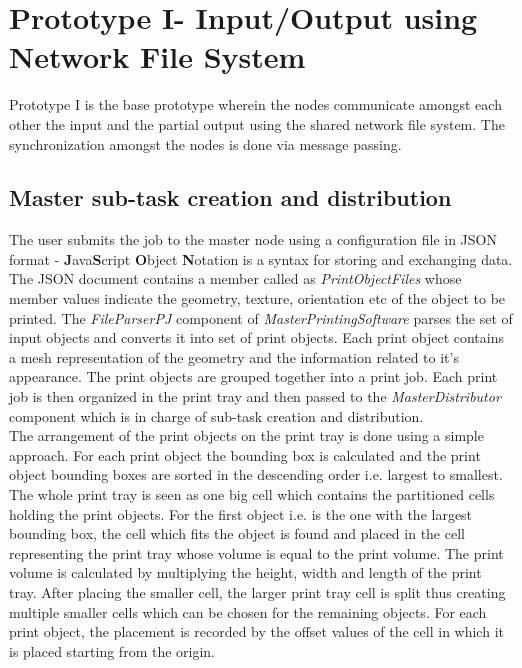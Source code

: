 \section{Prototype I- Input/Output using Network File System } \label{protoI}

Prototype I is the base prototype wherein the nodes communicate amongst each other the input and the partial output using the shared network file system. The synchronization amongst the nodes is done via message passing. 

\subsection{Master sub-task creation and distribution}
The user submits the job to the master node using a configuration file in JSON format - \textbf{J}ava\textbf{S}cript \textbf{O}bject \textbf{N}otation is a syntax for storing and exchanging data. The JSON document contains a member called as \textit{PrintObjectFiles} whose member values indicate the geometry, texture, orientation etc of the object to be printed. The \textit{FileParserPJ} component of \textit{MasterPrintingSoftware} parses the set of input objects and converts it into set of print objects. Each print object contains a mesh representation of the geometry and the information related to it's appearance. The print objects are grouped together into a print job. Each print job is then organized in the print tray and then passed to the \textit{MasterDistributor} component which is in charge of sub-task creation and distribution. \\

The arrangement of the print objects on the print tray is done using a simple approach. For each print object the bounding box is calculated and the print object bounding boxes are sorted in the descending order i.e. largest to smallest. The whole print tray is seen as one big cell which contains the partitioned cells holding the print objects. For the first object i.e. is the one with the largest bounding box, the cell which fits the object is found and placed in the cell representing the print tray whose volume is equal to the print volume. The print volume is calculated by multiplying the height, width and length of the print tray. After placing the smaller cell, the larger print tray cell is split thus creating multiple smaller cells which can be chosen for the remaining objects. For each print object, the placement is recorded by the offset values of the cell in which it is placed starting from the origin. \\    

